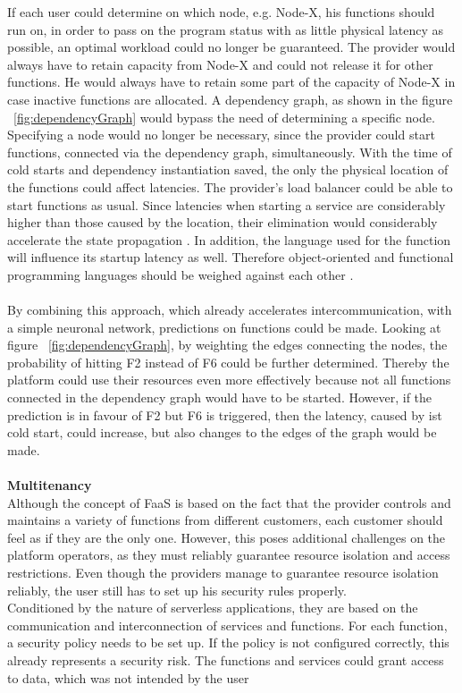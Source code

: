 \documentclass[a4paper,twoside,11pt, pagesize]{scrartcl}
\begin{document}
If each user could determine on which node, e.g. Node-X, his functions should run on, in order to pass on the program status with as little physical latency as possible, an optimal workload could no longer be guaranteed. The provider would always have to retain capacity from Node-X and could not release it for other functions. He would always have to retain some part of the capacity of Node-X in case inactive functions are allocated. A dependency graph, as shown in the figure ~\ref{fig:dependencyGraph} would bypass the need of determining a specific node. Specifying a node would no longer be necessary, since the provider could start functions, connected via the dependency graph, simultaneously. With the time of cold starts and dependency instantiation saved, the only the physical location of the functions could affect latencies. The provider's load balancer could be able to start functions as usual. Since latencies when starting a service are considerably higher than those caused by the location, their elimination would considerably accelerate the state propagation \cite{aditya2019will} \cite{jackson2018investigation}. In addition, the language used for the function will influence its startup latency as well. Therefore object-oriented and functional programming languages should be weighed against each other \cite{manner2018cold}.\\\\ By combining this approach, which already accelerates intercommunication, with a simple neuronal network, predictions on functions could be made. Looking at figure ~\ref{fig:dependencyGraph}, by weighting the edges connecting the nodes, the probability of hitting F2 instead of F6 could be further determined. Thereby the platform could use their resources even more effectively because not all functions connected in the dependency graph would have to be started. However, if the prediction is in favour of F2 but F6 is triggered, then the latency, caused by ist cold start, could increase, but also changes to the edges of the graph would be made.\\\\ \textbf{Multitenancy}\\ Although the concept of FaaS is based on the fact that the provider controls and maintains a variety of functions from different customers, each customer should feel as if they are the only one. However, this poses additional challenges on the platform operators, as they must reliably guarantee resource isolation and access restrictions. Even though the providers manage to guarantee resource isolation reliably, the user still has to set up his security rules properly.\\ Conditioned by the nature of serverless applications, they are based on the communication and interconnection of services and functions. For each function, a security policy needs to be set up. If the policy is not configured correctly, this already represents a security risk. The functions and services could grant access to data, which was not intended by the user 
\end{document}
